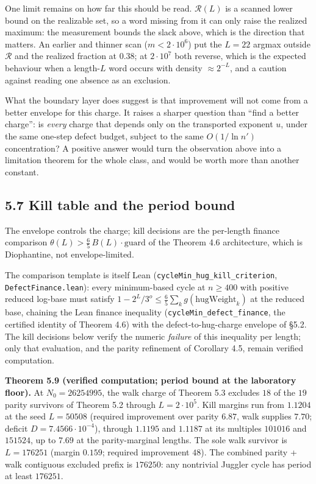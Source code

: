 \documentclass[12pt]{article}
\begin{document}
One limit remains on how far this should be read. \(\mathcal R(L)\) is a
scanned lower bound on the realizable set, so a word missing from it can
only raise the realized maximum: the measurement bounds the slack above,
which is the direction that matters. An earlier and thinner scan
(\(m<2\cdot10^{6}\)) put the \(L=22\) argmax outside \(\mathcal R\) and
the realized fraction at \(0.38\); at \(2\cdot10^{7}\) both reverse,
which is the expected behaviour when a length-\(L\) word occurs with
density \(\approx2^{-L}\), and a caution against reading one absence as
an exclusion.

What the boundary layer does suggest is that improvement will not come
from a better envelope for this charge. It raises a sharper question
than ``find a better charge'': is \emph{every} charge that depends only
on the transported exponent \(u\), under the same one-step defect
budget, subject to the same \(O(1/\ln n')\) concentration? A positive
answer would turn the observation above into a limitation theorem for
the whole class, and would be worth more than another constant.

\subsection{5.7 Kill table and the period
bound}\label{kill-table-and-the-period-bound}

The envelope controls the charge; kill decisions are the per-length
finance comparison \(\theta(L)>\tfrac65\,B(L)\cdot\text{guard}\) of the
Theorem 4.6 architecture, which is Diophantine, not envelope-limited.

The comparison template is itself Lean
(\texttt{\nolinkurl{cycleMin_hug_kill_criterion}},
\texttt{\nolinkurl{DefectFinance.lean}}): every minimum-based cycle at
\(n\ge 400\) with positive reduced log-base must satisfy
\(1-2^L/3^o\le\tfrac65\sum_k g(\text{hugWeight}_k)\) at the reduced
base, chaining the Lean finance inequality
(\texttt{\nolinkurl{cycleMin_defect_finance}}, the certified identity of
Theorem 4.6) with the defect-to-hug-charge envelope of §5.2. The kill
decisions below verify the numeric \emph{failure} of this inequality per
length; only that evaluation, and the parity refinement of Corollary
4.5, remain verified computation.

\textbf{Theorem 5.9 (verified computation; period bound at the
laboratory floor).} At \(N_0=26254995\), the walk charge of Theorem 5.3
excludes \(18\) of the \(19\) parity survivors of Theorem 5.2 through
\(L=2\cdot 10^5\). Kill margins run from \(1.1204\) at the seed
\(L=50508\) (required improvement over parity \(6.87\), walk supplies
\(7.70\); deficit \(D=7.4566\cdot 10^{-4}\)), through \(1.1195\) and
\(1.1187\) at its multiples \(101016\) and \(151524\), up to \(7.69\) at
the parity-marginal lengths. The sole walk survivor is \(L=176251\)
(margin \(0.159\); required improvement \(48\)). The combined parity +
walk contiguous excluded prefix is \(176250\): any nontrivial Juggler
cycle has period at least \(176251\).
\end{document}
